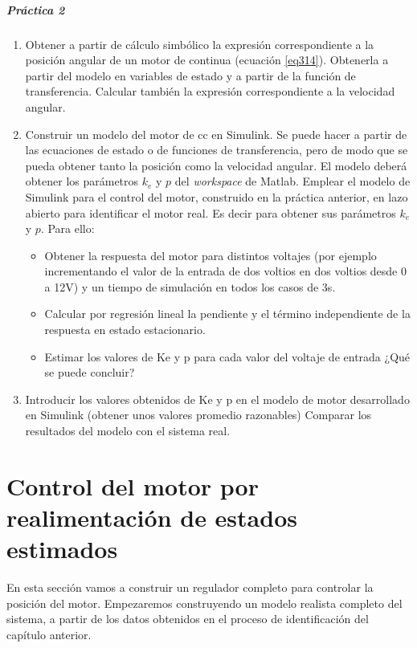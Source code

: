 \documentclass[10pt,a4paper]{report}
\begin{document}
\paragraph{Práctica 2}
\begin{enumerate}
\item Obtener a partir de cálculo simbólico la expresión correspondiente a la posición angular de un motor de continua (ecuación \ref{eq314}). Obtenerla a partir del modelo en variables de estado y a partir de la función de transferencia. Calcular también la expresión correspondiente a la velocidad angular.
\item Construir un modelo del motor de cc en Simulink. Se puede hacer a partir de las ecuaciones de estado o de funciones de transferencia, pero de modo que se pueda obtener tanto la posición como la velocidad angular. El modelo deberá obtener los parámetros $k_e$ y $p$ del \emph{workspace} de Matlab.
Emplear el modelo de Simulink para el control del motor, construido en la práctica anterior, en lazo abierto para identificar el motor real. Es decir para obtener sus parámetros $k_e$ y $p$. Para ello:
\begin{itemize}
\item Obtener la respuesta del motor para distintos voltajes (por ejemplo incrementando el valor de la entrada de dos voltios en dos voltios desde 0 a 12V) y un tiempo de simulación en todos los casos de 3s.
\item Calcular por regresión lineal la pendiente y el término independiente de la respuesta en estado estacionario.
\item Estimar los valores de Ke y p para cada valor del voltaje de entrada ¿Qué se puede concluir?
\end{itemize} 
\item Introducir los valores obtenidos de Ke y p en el modelo de motor desarrollado en Simulink (obtener unos valores promedio razonables) Comparar los resultados del modelo con el sistema real.
\end{enumerate}

\chapter{Control del motor por realimentación de estados estimados}
En esta sección vamos a construir un regulador completo para controlar la posición del motor. Empezaremos construyendo un modelo realista completo del sistema, a partir de los datos obtenidos en el proceso de identificación del capítulo anterior.
\end{document}
